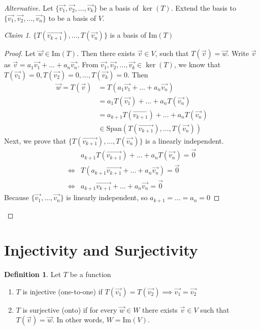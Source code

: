 \documentclass{article}
\theoremstyle{definition}
\newtheorem{definition}[theorem]{Definition}
\theoremstyle{remark}
\newtheorem{claim}[theorem]{Claim}
\begin{document}
\begin{proof}[Alternative]
    Let $\{\vec{v_1},\vec{v_2},\dots,\vec{v_k}\}$ be a basis of $\ker(T)$.
    Extend the basis to $\{\vec{v_1},\vec{v_2},\dots,\vec{v_n}\}$ to be a basis of $V$.
    \begin{claim}
        $\{T(\vec{v_{k+1}}),\dots,T(\vec{v_n})\}$ is a basis of Im$(T)$
    \end{claim}
\begin{proof}
    Let $\vec{w}\in \text{Im}(T)$.
    Then there exists $\vec{v}\in V$, such that $T(\vec{v})=\vec{w}$.
    Write $\vec{v}$ as $\vec{v}=a_1\vec{v_1}+\dots+a_n\vec{v_n}$.
    From $\vec{v_1},\vec{v_2},\dots,\vec{v_k}\in\ker(T)$, we know that $T(\vec{v_1})=0,T(\vec{v_2})=0,\dots,T(\vec{v_k})=0$.
    Then
    \[
    \begin{aligned}
    \vec{w}=T(\vec{v})&=T(a_1\vec{v_1}+\dots+a_n\vec{v_n})\\
    &=a_1T(\vec{v_1})+\dots+a_nT(\vec{v_n})\\
    &=a_{k+1}T(\vec{v_{k+1}})+\dots+a_nT(\vec{v_n})\\
    &\in \text{Span}(T(\vec{v_{k+1}}),\dots,T(\vec{v_n}))
    \end{aligned}
    \]
    Next, we prove that $\{T(\vec{v_{k+1}}),\dots,T(\vec{v_n})\}$ is a linearly independent.
    \[
    \begin{aligned}
        &a_{k+1}T(\vec{v_{k+1}})+\dots+a_nT(\vec{v_n})=\vec{0}\\
        \iff &T(a_{k+1}\vec{v_{k+1}}+\dots+a_n\vec{v_n})=\vec{0}\\
        \iff & a_{k+1}\vec{v_{k+1}}+\dots+a_n\vec{v_n}=\vec{0}
    \end{aligned}
    \]
    Because $\{\vec{v_1},\dots,\vec{v_n}\}$ is linearly independent, so $a_{k+1}=\dots=a_n=0$
\end{proof}

\end{proof}

\section{Injectivity and Surjectivity}

\begin{definition}
    Let $T$ be a function
    \begin{enumerate}
        \item $T$ is injective (one-to-one) if $T(\vec{v_1})=T(\vec{v_2})\implies \vec{v_1}=\vec{v_2}$
        \item $T$ is surjective (onto) if for every $\vec{w}\in W$ there exists $\vec{v}\in V$ such that $T(\vec{v})=\vec{w}$.
        In other words, $W=\text{Im}(V)$.
    \end{enumerate}
\end{definition}
\end{document}
